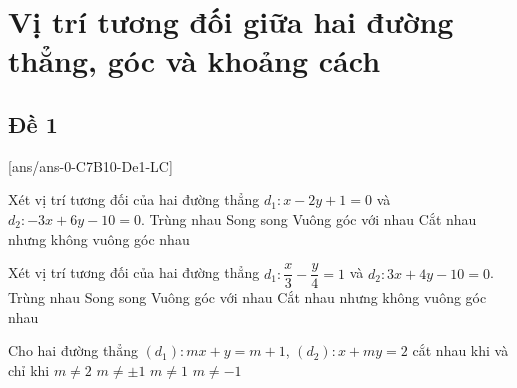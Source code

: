 \section{Vị trí tương đối giữa hai đường thẳng, góc và khoảng cách}

\subsection{Đề 1}
[ans/ans-0-C7B10-De1-LC]
\caulc
\begin{ex}%
Xét vị trí tương đối của hai đường thẳng $d_1 \colon x-2 y+1=0$ và $d_2 \colon -3 x+6 y-10=0$.
\choice
{Trùng nhau}
{\True Song song}
{Vuông góc với nhau}
{Cắt nhau nhưng không vuông góc nhau}
\end{ex}

\begin{ex}%
Xét vị trí tương đối của hai đường thẳng $d_1 \colon \dfrac{x}{3}-\dfrac{y}{4}=1$ và $d_2 \colon 3 x+4 y-10=0$.
\choice
{Trùng nhau}
{Song song}
{\True Vuông góc với nhau}
{Cắt nhau nhưng không vuông góc nhau}
\end{ex}

\begin{ex}%
Cho hai đường thẳng $\left(d_1\right) \colon m x+y=m+1$, $\left(d_2\right) \colon x+m y=2$ cắt nhau khi và chỉ khi
\choice
{$m \neq 2$}
{$m \neq \pm 1$}
{\True $m \neq 1$}
{$m \neq-1$}
\end{ex}

